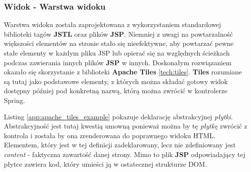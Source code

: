		\subsubsection{Widok - Warstwa widoku}
			Warstwa widoku została zaprojektowana z wykorzystaniem standardowej biblioteki tagów \textbf{JSTL} oraz plików \textbf{JSP}. Niemniej
			z uwagi na powtarzalność większości elementów na stronie stało się nieefektywne, aby powtarzać pewne stałe elementy w każdym pliku JSP
			lub opierać się na względnych ścieżkach podczas zawierania innych plików \textbf{JSP} w innych. Doskonałym rozwiązaniem okazało
			się skorzystanie z biblioteki \textbf{Apache Tiles} \ref{tech:tiles}. \textbf{Tiles} rozumiane są tutaj jako podstawowe elementy, z których
			można składać gotowy widok dostępny później pod konkretną nazwą, którą można zwrócić w kontrolerze Spring.
			Listing \ref{app:apache_tiles_example} pokazuje deklarację abstrakcyjnej \textit{płytki}. Abstrakcyjność jest tutaj kwestią umowną ponieważ
			można by tę \textit{płytkę} zwrócić z kontrola i została by ona zrenderowana do poprawnego widoku HTML. Elementem, który jest w tej definicji
			zadeklarowany, lecz nie zdefiniowany jest \textit{content} - faktyczna zawartość danej strony. Mimo to plik \textbf{JSP} odpowiadający tej płytce
			zawiera kod, który umieści ją w ostatecznej strukturze DOM. 
		
